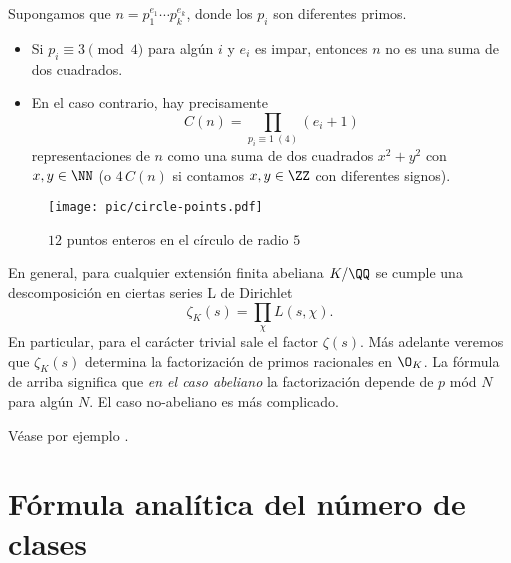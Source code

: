 \begin{teorema}
  Supongamos que $n = p_1^{e_1}\cdots p_k^{e_k}$, donde los $p_i$ son diferentes
  primos.
  \begin{itemize}
  \item Si $p_i \equiv 3 \pmod{4}$ para algún $i$ y $e_i$ es impar, entonces
    $n$ no es una suma de dos cuadrados.

  \item En el caso contrario, hay precisamente
    $$C (n) = \prod_{p_i \equiv 1~(4)} (e_i + 1)$$
    representaciones de $n$ como una suma de dos cuadrados $x^2 + y^2$ con
    $x,y \in \NN$ (o $4\,C(n)$ si contamos $x,y\in \ZZ$ con diferentes signos).
  \end{itemize}
\end{teorema}

\begin{figure}
  \begin{center}
    \texttt{[image: pic/circle-points.pdf]}
  \end{center}

  \caption{$12$ puntos enteros en el círculo de radio $5$}
\end{figure}

\begin{comentario}
  En general, para cualquier extensión finita abeliana $K/\QQ$ se cumple
  una descomposición en ciertas series L de Dirichlet
  $$\zeta_K (s) = \prod_\chi L (s,\chi).$$
  En particular, para el carácter trivial sale el factor $\zeta (s)$.
  Más adelante veremos que $\zeta_K (s)$ determina la factorización de primos
  racionales en $\O_K$. La fórmula de arriba significa que
  \emph{en el caso abeliano} la factorización depende de $p$ mód $N$ para algún
  $N$. El caso no-abeliano es más complicado.

  Véase por ejemplo \cite[Chapter~4]{Washington-GTM83}.
\end{comentario}


\section{Fórmula analítica del número de clases}

